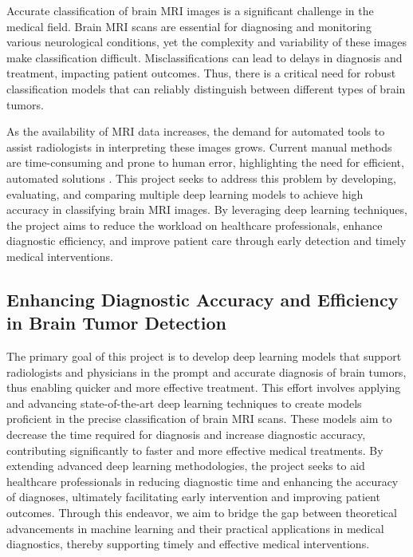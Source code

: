 Accurate classification of brain MRI images is a significant challenge in the medical field. Brain MRI scans are essential for diagnosing and monitoring various neurological conditions, yet the complexity and variability of these images make classification difficult. Misclassifications can lead to delays in diagnosis and treatment, impacting patient outcomes\cite{iorgulescu_misclassification_2019}. Thus, there is a critical need for robust classification models that can reliably distinguish between different types of brain tumors.

As the availability of MRI data increases, the demand for automated tools to assist radiologists in interpreting these images grows. Current manual methods are time-consuming and prone to human error, highlighting the need for efficient, automated solutions \cite{lenchik_automated_2019}. This project seeks to address this problem by developing, evaluating, and comparing multiple deep learning models to achieve high accuracy in classifying brain MRI images. By leveraging deep learning techniques, the project aims to reduce the workload on healthcare professionals, enhance diagnostic efficiency, and improve patient care through early detection and timely medical interventions.

\subsection{Enhancing Diagnostic Accuracy and Efficiency in Brain Tumor Detection}\label{s:objective}

The primary goal of this project is to develop deep learning models that support radiologists and physicians in the prompt and accurate diagnosis of brain tumors, thus enabling quicker and more effective treatment. This effort involves applying and advancing state-of-the-art deep learning techniques to create models proficient in the precise classification of brain MRI scans. These models aim to decrease the time required for diagnosis and increase diagnostic accuracy, contributing significantly to faster and more effective medical treatments. By extending advanced deep learning methodologies, the project seeks to aid healthcare professionals in reducing diagnostic time and enhancing the accuracy of diagnoses, ultimately facilitating early intervention and improving patient outcomes. Through this endeavor, we aim to bridge the gap between theoretical advancements in machine learning and their practical applications in medical diagnostics, thereby supporting timely and effective medical interventions.


